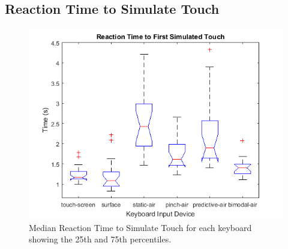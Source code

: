 \subsection{Reaction Time to Simulate Touch}
\begin{figure}[h]
	\centering
	\includegraphics{fig_reaction_touch_boxplot}
	\caption[Reaction Time to Simulate Touch Boxplot]{Median Reaction Time to Simulate Touch for each keyboard showing the 25th and 75th percentiles.}
	\label{fig_reaction_touch_boxplot}
\end{figure}

